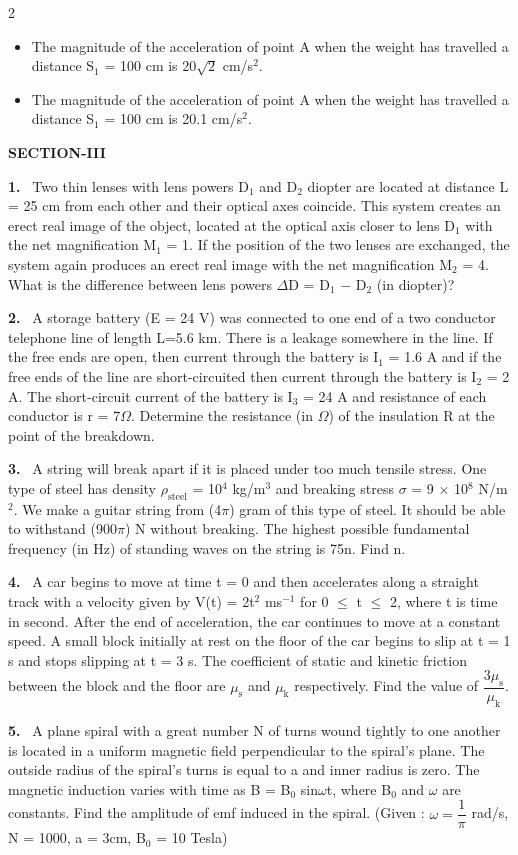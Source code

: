 \documentclass[10pt]{extarticle}
\newcommand{\sect}[1]{\par\smallskip\noindent\textbf{#1}\par}
\newcommand{\qn}[1]{\par\smallskip\noindent\textbf{#1.}~}
\newenvironment{qoptions}{\begin{itemize}[leftmargin=1.8em,itemsep=1pt,topsep=2pt,label={}]}{\end{itemize}}
\newcommand{\opt}[2]{\item[(#1)] #2}
\begin{document}
\begin{multicols}{2}
\begin{qoptions}
\opt{C}{The magnitude of the acceleration of point A when the weight has travelled a distance S$_1$ = 100 cm is $20\sqrt2$ cm/s$^2$.}
\opt{D}{The magnitude of the acceleration of point A when the weight has travelled a distance S$_1$ = 100 cm is 20.1 cm/s$^2$.}
\end{qoptions}
\sect{SECTION-III}
\qn{1} Two thin lenses with lens powers D$_1$ and D$_2$ diopter are located at distance L = 25 cm from each other and their optical axes coincide. This system creates an erect real image of the object, located at the optical axis closer to lens D$_1$ with the net magnification M$_1$ = 1. If the position of the two lenses are exchanged, the system again produces an erect real image with the net magnification M$_2$ = 4. What is the difference between lens powers $\Delta$D = D$_1$ $-$ D$_2$ (in diopter)?
\qn{2} A storage battery (E = 24 V) was connected to one end of a two conductor telephone line of length L=5.6 km. There is a leakage somewhere in the line. If the free ends are open, then current through the battery is I$_1$ = 1.6 A and if the free ends of the line are short-circuited then current through the battery is I$_2$ = 2 A. The short-circuit current of the battery is I$_3$ = 24 A and resistance of each conductor is r = 7$\Omega$. Determine the resistance (in $\Omega$) of the insulation R at the point of the breakdown.
\qn{3} A string will break apart if it is placed under too much tensile stress. One type of steel has density $\rho_{\mathrm{steel}}$ = 10$^4$ kg/m$^3$ and breaking stress $\sigma$ = 9 $\times$ 10$^8$ N/m$^2$. We make a guitar string from (4$\pi$) gram of this type of steel. It should be able to withstand (900$\pi$) N without breaking. The highest possible fundamental frequency (in Hz) of standing waves on the string is 75n. Find n.
\qn{4} A car begins to move at time t = 0 and then accelerates along a straight track with a velocity given by V(t) = 2t$^2$ ms$^{-1}$ for 0 $\leq$ t $\leq$ 2, where t is time in second. After the end of acceleration, the car continues to move at a constant speed. A small block initially at rest on the floor of the car begins to slip at t = 1 s and stops slipping at t = 3 s. The coefficient of static and kinetic friction between the block and the floor are $\mu_\mathrm s$ and $\mu_\mathrm k$ respectively. Find the value of $\dfrac{3\mu_\mathrm s}{\mu_\mathrm k}$.
\qn{5} A plane spiral with a great number N of turns wound tightly to one another is located in a uniform magnetic field perpendicular to the spiral's plane. The outside radius of the spiral's turns is equal to a and inner radius is zero. The magnetic induction varies with time as B = B$_0$ sin$\omega$t, where B$_0$ and $\omega$ are constants. Find the amplitude of emf induced in the spiral. (Given : $\omega=\dfrac1\pi$ rad/s, N = 1000, a = 3cm, B$_0$ = 10 Tesla)

\end{multicols}
\end{document}
